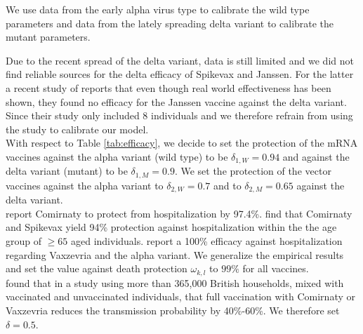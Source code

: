 We use data from the early alpha virus type to calibrate the wild type parameters and data from the lately spreading delta variant to calibrate the mutant parameters. 


Due to the recent spread of the delta variant, data is still limited and we did not find reliable sources for the delta efficacy of Spikevax and Janssen. For the latter a recent study of \cite{Jongeneelen.2021} reports that even though real world effectiveness has been shown, they found no efficacy for the Janssen vaccine against the delta variant. Since their study only included 8 individuals and we therefore refrain from using the study to calibrate our model. \\

With respect to Table \ref{tab:efficacy}, we decide to set the protection of the mRNA vaccines against the alpha variant (wild type) to be $\delta_{1, W} = 0.94$ and against the delta variant (mutant) to be $\delta_{1, M} = 0.9$. We set the protection of the vector vaccines against the alpha variant to $\delta_{2, W} = 0.7$ and to $\delta_{2, M} = 0.65$ against the delta variant.\\

\cite{Abu.2021} report Comirnaty to protect from hospitalization by 97.4\%. \cite{Tenforde.2021} find that Comirnaty and Spikevax yield 94\% protection against hospitalization within the the age group of $\geq 65$ aged individuals. \cite{Voysey.2021} report a 100\% efficacy against hospitalization regarding Vaxzevria and the alpha variant. We generalize the empirical results and set the value against death protection $\omega_{k,l}$ to $99\%$ for all vaccines.\\

\cite{Harris.2021} found that in a study using more than 365,000 British households, mixed with vaccinated and unvaccinated individuals, that full vaccination with Comirnaty or Vaxzevria reduces the transmission probability by 40\%-60\%. We therefore set $\delta = 0.5$. \\


